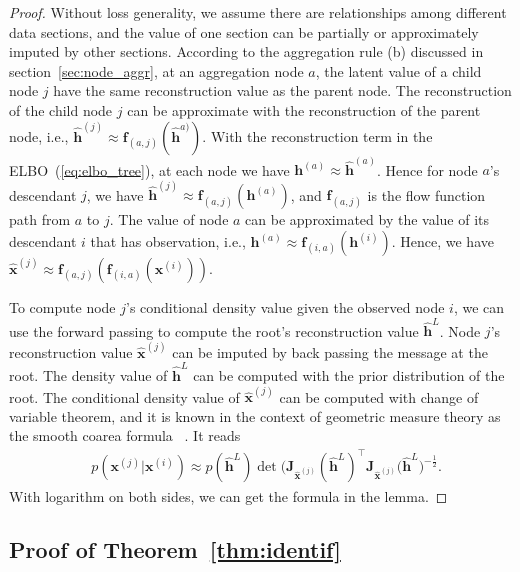 \documentclass[twoside]{article}
\begin{document}
\begin{proof}
Without loss generality, we assume there are relationships among different data sections, and the value of one section can be partially or approximately imputed by other sections. According to the aggregation rule (b) discussed in section~\ref{sec:node_aggr}, at an aggregation node  $a$, the latent value of a child node $j$ have the same reconstruction value as the parent node.  The reconstruction of the child node $j$ can be approximate with the reconstruction of the parent node,   i.e., $\widehat{\mathbf{h}}^{(j)} \approx \mathbf{f}_{(a,j)}(\widehat{\mathbf{h}}^{a)})$. With the reconstruction term in the ELBO~(\ref{eq:elbo_tree}), at each node we have $\mathbf{h}^{(a)} \approx \widehat{\mathbf{h}}^{(a)}$. Hence for node $a$'s descendant $j$, we have $\widehat{\mathbf{h}}^{(j)} \approx \mathbf{f}_{(a,j)}(\mathbf{h}^{(a)})$, and $\mathbf{f}_{(a,j)}$ is the flow function path from $a$ to $j$. The value of node $a$ can be approximated by the value of its descendant $i$ that has observation, i.e., $\mathbf{h}^{(a)} \approx \mathbf{f}_{(i,a)}(\mathbf{h}^{(i)})$. Hence, we have $\widehat{\mathbf{x}}^{(j)} \approx  \mathbf{f}_{(a,j)}(\mathbf{f}_{(i, a)}(\mathbf{x}^{(i)}))$.

To compute  node $j$'s conditional density value given the observed node $i$, we can use the forward passing to compute the root's reconstruction  value $\widehat{\mathbf{h}}^L$. Node $j$'s reconstruction value $\widehat{\mathbf{x}}^{(j)}$ can be imputed by back passing the message at the root. The density value of $\widehat{\mathbf{h}}^L$ can be computed with the prior distribution of the root. The conditional density value of $\widehat{\mathbf{x}}^{(j)}$ can be computed with change of variable theorem, and it is known in the context of geometric measure theory as the smooth coarea formula ~\cite{Article:Krantz_2008,Book:Hanson_1994}. It reads 
\begin{align*} %
&  p(\mathbf{x}^{(j)} | \mathbf{x}^{(i)} ) \approx p(\widehat{\mathbf{h}}^L)\det\big(\mathbf{J}_{\widehat{\mathbf{x}}^{(j)}}(\widehat{\mathbf{h}}^L)^\top  \mathbf{J}_{\widehat{\mathbf{x}}^{(j)}}(\widehat{\mathbf{h}}^L\big)^{-\frac{1}{2}}.
\end{align*}
With logarithm on both sides, we can get the formula in the lemma.


\end{proof}


\subsection{Proof of Theorem~\ref{thm:identif}}\label{appd:proof_thm1}
\end{document}
